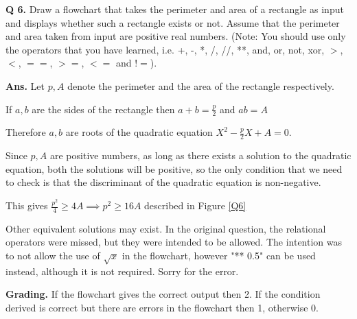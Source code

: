 \documentclass{article}
\begin{document}
\clearpage

\begin{flushleft}

\textbf{Q 6. } Draw a flowchart that takes the perimeter and area of a rectangle as 
input and displays whether such a rectangle exists or not. Assume that the perimeter and
area taken from input are positive real numbers. (Note: You should use only the operators
that you have learned, i.e. +, -, *, /, //, **, and, or, not, xor, $>$, $<$, $==$, $>=$, $<=$ and $!=$).
    
\end{flushleft}

\begin{flushleft}

\textbf{Ans. } Let $p, A$ denote the perimeter and the area of the rectangle respectively.

If $a, b$ are the sides of the rectangle then $a + b = \frac{p}{2}$ and $ab = A$

Therefore $a, b$ are roots of the quadratic equation $X^2 - \frac{p}{2}X + A = 0$.

Since $p, A$ are positive numbers, as long as there exists a solution to the quadratic equation, 
both the solutions will be positive, so the only condition that we need to check is that the 
discriminant of the quadratic equation is non-negative.

This gives $\frac{p^2}{4} \geq 4A \implies p^2 \geq 16 A$ described in Figure \ref{Q6}

Other equivalent solutions may exist. In the original question, the relational operators
were missed, but they were intended to be allowed. The intention was to not allow the use 
of $\sqrt{x}$ in the flowchart, however "** 0.5" can be used instead, although it is not required. 
Sorry for the error.

\end{flushleft}

\begin{flushleft}

\textbf{Grading. } If the flowchart gives the correct output then 2. If the condition derived is 
correct but there are errors in the flowchart then 1, otherwise 0.
        
\end{flushleft}
\end{document}
